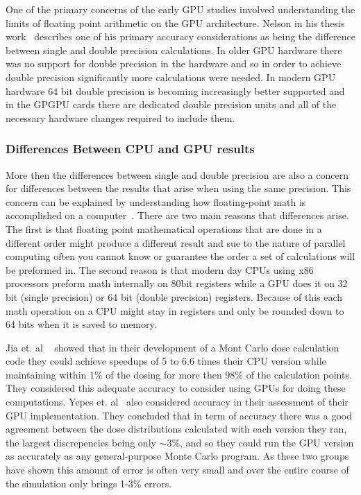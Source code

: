 One of the primary concerns of the early GPU studies involved understanding the limits of floating point arithmetic on the GPU architecture.
%
Nelson in his thesis work~\cite{nelson2009monte} describes one of his primary accuracy considerations as being the difference between single and double precision calculations.
%
In older GPU hardware there was no support for double precision in the hardware and so in order to achieve double precision significantly more calculations were needed.
%
In modern GPU hardware 64 bit double precision is becoming increasingly better supported and in the GPGPU cards there are dedicated double precision units and all of the necessary hardware changes required to include them.
%

\subsubsection*{\textbf{Differences Between CPU and GPU results} }

More then the differences between single and double precision are also a concern for differences between the results that arise when using the same precision.
%
This concern can be explained by understanding how floating-point math is accomplished on a computer~\cite{goldberg1991every}.
%
There are two main reasons that differences arise.
%
The first is that floating point mathematical operations that are done in a different order might produce a different result and sue to the nature of parallel computing often you cannot know or guarantee the order a set of calculations will be preformed in.
%
The second reason is that modern day CPUs using x86 processors preform math internally on 80bit registers while a GPU does it on 32 bit (single precision) or 64 bit (double precision) registers.
%
Because of this each math operation on a CPU might stay in registers and only be rounded down to 64 bits when it is saved to memory.
%

%
Jia et. al ~\cite{jia2010development} showed that in their development of a Mont Carlo dose calculation code they could achieve speedups of 5 to 6.6 times their CPU version while maintaining within 1\% of the dosing for more then 98\% of the calculation points.
%
They considered this adequate accuracy to consider using GPUs for doing these computations.
%
Yepes et. al~\cite{yepes2010gpu} also considered accuracy in their assessment of their GPU implementation.
%
They concluded that in term of accuracy there was a good agreement between the dose distributions calculated with each version they ran, the largest discrepencies being only $\sim$3\%, and so they could run the GPU version as accurately as any general-purpose Monte Carlo program.
%
As these two groups have shown this amount of error is often very small and over the entire course of the simulation only brings 1-3\% errors.

